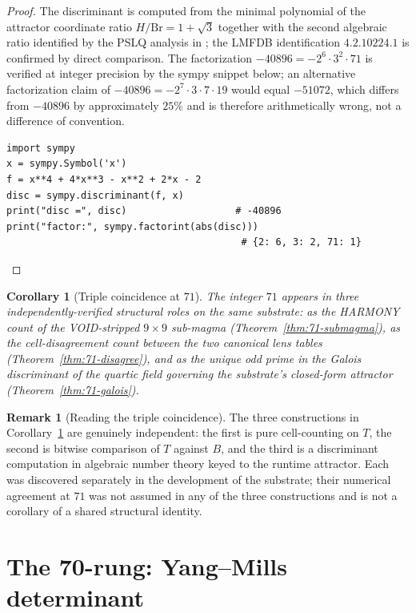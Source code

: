 \documentclass[11pt,reqno]{amsart}
\newtheorem{corollary}[theorem]{Corollary}
\theoremstyle{definition}
\newtheorem{remark}[theorem]{Remark}
\begin{document}
\begin{proof}
The discriminant is computed from the minimal polynomial of the
attractor coordinate ratio $H/\mathrm{Br} = 1 + \sqrt{3}$ together
with the second algebraic ratio identified by the PSLQ analysis in
\cite{Sanders2026Attractor}; the LMFDB identification $4.2.10224.1$
is confirmed by direct comparison. The factorization
$-40896 = -2^6 \cdot 3^2 \cdot 71$ is verified at integer precision
by the sympy snippet below; an alternative factorization claim of
$-40896 = -2^7 \cdot 3 \cdot 7 \cdot 19$ would equal $-51072$, which
differs from $-40896$ by approximately $25\%$ and is therefore
arithmetically wrong, not a difference of convention.

\begin{lstlisting}[style=plainpy]
import sympy
x = sympy.Symbol('x')
f = x**4 + 4*x**3 - x**2 + 2*x - 2
disc = sympy.discriminant(f, x)
print("disc =", disc)                   # -40896
print("factor:", sympy.factorint(abs(disc)))
                                         # {2: 6, 3: 2, 71: 1}
\end{lstlisting}
\end{proof}

\begin{corollary}[Triple coincidence at $71$]
\label{cor:71-triple}
The integer $71$ appears in three independently-verified structural
roles on the same substrate: as the HARMONY count of the VOID-stripped
$9 \times 9$ sub-magma (Theorem~\ref{thm:71-submagma}), as the
cell-disagreement count between the two canonical lens tables
(Theorem~\ref{thm:71-disagree}), and as the unique odd prime in the
Galois discriminant of the quartic field governing the substrate's
closed-form attractor (Theorem~\ref{thm:71-galois}).
\end{corollary}

\begin{remark}[Reading the triple coincidence]
\label{rem:71-reading}
The three constructions in Corollary~\ref{cor:71-triple} are
genuinely independent: the first is pure cell-counting on $T$, the
second is bitwise comparison of $T$ against $B$, and the third is a
discriminant computation in algebraic number theory keyed to the
runtime attractor. Each was discovered separately in the development
of the substrate; their numerical agreement at $71$ was not assumed
in any of the three constructions and is not a corollary of a
shared structural identity.
\end{remark}

\section{The 70-rung: Yang--Mills determinant}
\label{sec:70}
\end{document}
